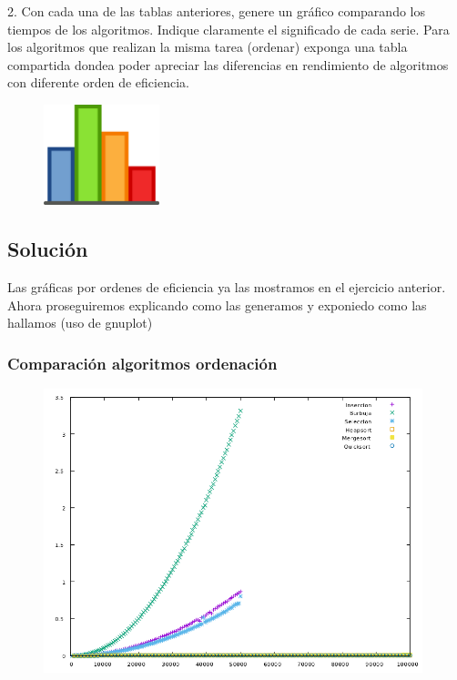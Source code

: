 \documentclass[compress]{beamer}
\begin{document}
\begin{frame}
	2. Con cada una de las tablas anteriores, genere un gráfico comparando los tiempos  de
los algoritmos. Indique claramente el significado de cada serie. Para los algoritmos que
realizan la misma tarea (ordenar) exponga una tabla compartida dondea poder apreciar las diferencias en rendimiento de algoritmos con diferente orden de
eficiencia.
	\begin{figure}
  \centering
    \includegraphics[width=0.3\textwidth]{graf.png}
  \label{fig:ejemplo}
\end{figure}
\end{frame}
\subsection{Solución}
\begin{frame}
Las gráficas por ordenes de eficiencia ya las mostramos en el ejercicio anterior. Ahora proseguiremos explicando como las generamos y exponiedo como las hallamos (uso de gnuplot)
\end{frame}
\begin{frame}
\frametitle{Comparación algoritmos ordenación}
	\begin{figure}
  \centering
    \includegraphics[width=0.98\textwidth]{Ordenacion.png}
  \label{fig:ejemplo}
\end{figure}
\end{frame}
\end{document}
